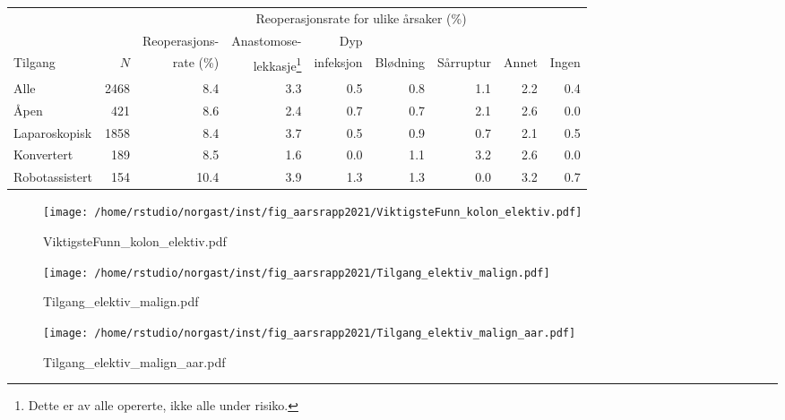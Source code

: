 \documentclass[norsk,a4paper]{article}\usepackage[]{graphicx}\usepackage[]{color}
\begin{document}
\begin{table}[htb]
\begin{minipage}{\textwidth}
\centering
\begin{tabular}{lrrrrrrrr}
  \toprule
  & & & \multicolumn{4}{c}{Reoperasjonsrate for ulike årsaker (\%)} \\
 \cline{4-9} 
 & & Reoperasjons- & Anastomose- & Dyp &&&&  \\
 Tilgang & $N$ & rate (\%) & lekkasje\footnote[2]{Dette er av alle opererte, ikke
alle under risiko.} & infeksjon & Blødning & Sårruptur & Annet & Ingen \\
 \midrule
Alle & 2468 & 8.4 & 3.3 & 0.5 & 0.8 & 1.1 & 2.2 & 0.4 \\ 
  Åpen & 421 & 8.6 & 2.4 & 0.7 & 0.7 & 2.1 & 2.6 & 0.0 \\ 
  Laparoskopisk & 1858 & 8.4 & 3.7 & 0.5 & 0.9 & 0.7 & 2.1 & 0.5 \\ 
  Konvertert & 189 & 8.5 & 1.6 & 0.0 & 1.1 & 3.2 & 2.6 & 0.0 \\ 
  Robotassistert & 154 & 10.4 & 3.9 & 1.3 & 1.3 & 0.0 & 3.2 & 0.7 \\ 
   \bottomrule
\end{tabular}

\end{minipage}
\end{table}




\begin{figure}[ht]
\centering
\texttt{[image: /home/rstudio/norgast/inst/fig\_aarsrapp2021/ViktigsteFunn\_kolon\_elektiv.pdf]}
\caption{ViktigsteFunn\_kolon\_elektiv.pdf}
\end{figure}

\begin{figure}[ht]
\centering
\texttt{[image: /home/rstudio/norgast/inst/fig\_aarsrapp2021/Tilgang\_elektiv\_malign.pdf]}
\caption{Tilgang\_elektiv\_malign.pdf}
\end{figure}

\begin{figure}[ht]
\centering
\texttt{[image: /home/rstudio/norgast/inst/fig\_aarsrapp2021/Tilgang\_elektiv\_malign\_aar.pdf]}
\caption{Tilgang\_elektiv\_malign\_aar.pdf}
\end{figure}
\end{document}
